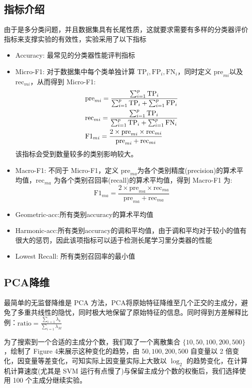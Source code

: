 \documentclass[fleqn]{Paquetes/RevDigMatEduInt}
\begin{document}
\subsection{指标介绍}
由于是多分类问题，并且数据集具有长尾性质，这就要求需要有多样的分类器评价指标来支撑实验的有效性，实验采用了以下指标
\begin{itemize}
	\item Accuracy: 最常见的分类器性能评判指标
	\item Micro-F1: 对于数据集中每个类单独计算 $\mathrm{TP}_i,\mathrm{FP}_i,\mathrm{FN}_i$，同时定义 $\mathrm{pre}_{mi}$以及$\mathrm{rec}_{mi}$，从而得到 Micro-F1:
	\begin{align}
		&\mathrm{pre}_{mi} = \frac{\sum_{i = 1}^p \mathrm{TP}_i}{\sum_{i = 1}^p \mathrm{TP}_i + \sum_{i = 1}^p \mathrm{FP}_i}\notag\\
		&\mathrm{rec}_{mi} = \frac{\sum_{i = 1}^p \mathrm{TP}_i}{\sum_{i = 1}^p \mathrm{TP}_i + \sum_{i = 1}^p \mathrm{FN}_i}\notag\\
		&\mathrm{F1}_{mi} = \frac{2\times \mathrm{pre}_{mi}\times \mathrm{rec}_{mi}}{\mathrm{pre}_{mi} + \mathrm{rec}_{mi}}\notag
	\end{align}
	该指标会受到数量较多的类别影响较大。
	\item Macro-F1: 不同于 Micro-F1，定义 $\mathrm{pre}_{ma}$为各个类别精度(precision)的算术平均值，$\mathrm{rec}_{ma}$ 为各个类别召回率(recall)的算术平均值，得到 Macro-F1 为:
	$$
	\mathrm{F1}_{ma} = \frac{2 \times \mathrm{pre}_{ma} \times \mathrm{rec}_{ma}}{\mathrm{pre}_{ma} + \mathrm{rec}_{ma}}
	$$
	\item Geometric-acc:所有类别accuracy的算术平均值
	\item Harmonic-acc:所有类别accuracy的调和平均值，由于调和平均对于较小的值有很大的惩罚，因此该项指标可以适于检测长尾学习里分类器的性能
	\item Lowest Recall: 所有类别召回率的最小值
\end{itemize}
\subsection{PCA降维}
最简单的无监督降维是 PCA 方法，PCA将原始特征降维至几个正交的主成分，避免了多重共线性的隐忧，同时极大地保留了原始特征的信息。同时得到方差解释比例：$\mathrm{ratio}=\frac{\sum_{i=1}\lambda_{k}}{\sum_{i=1}\lambda_M}$

为了搜索到一个合适的主成分个数，我们取了一个离散集合 $\{10,50,100,200,500\}$，绘制了 Figure 4来展示这种变化的趋势，由 $50,100,200,500$ 自变量以 2 倍变化，因变量等差变化，可知实际上因变量实际上大致以 $\log_2$ 的趋势变化，在计算机计算速度(尤其是 SVM 运行有点慢了)与保留主成分个数的权衡后，我们选择使用 100 个主成分继续实验。
\end{document}
